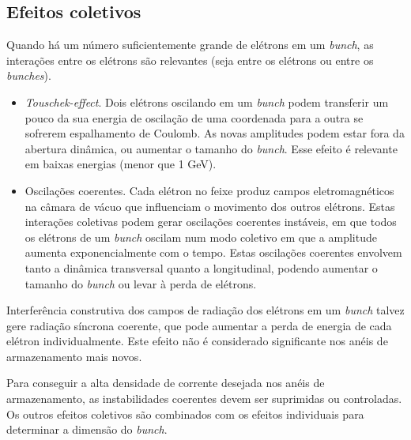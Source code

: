 \subsection{Efeitos coletivos}
Quando há um número suficientemente grande de elétrons em um \textit{bunch}, as interações entre os elétrons são relevantes (seja entre os elétrons ou entre os \textit{bunches}). 
	
\begin{itemize}
	\item \textit{Touschek-effect}. Dois elétrons oscilando em um \textit{bunch} podem transferir um 		pouco da sua energia de oscilação de uma coordenada para a outra se sofrerem espalhamento de 			Coulomb. As novas amplitudes podem estar fora da abertura dinâmica, ou aumentar o tamanho do 			\textit{bunch}. Esse efeito é relevante em baixas energias (menor que 1 GeV).
    \item Oscilações coerentes. Cada elétron no feixe produz campos eletromagnéticos na câmara de vácuo 	que influenciam o movimento dos outros elétrons. Estas interações coletivas podem gerar oscilações 		coerentes instáveis, em que todos os elétrons de um \textit{bunch} oscilam num modo coletivo em que 	a amplitude aumenta exponencialmente com o tempo. Estas oscilações coerentes envolvem tanto a 			dinâmica transversal quanto a longitudinal, podendo aumentar o tamanho do \textit{bunch} ou levar à 	perda de elétrons.
\end{itemize}
	
Interferência construtiva dos campos de radiação dos elétrons em um \textit{bunch} talvez gere radiação síncrona coerente, que pode aumentar a perda de energia de cada elétron individualmente. Este efeito não é considerado significante nos anéis de armazenamento mais novos.
	
Para conseguir a alta densidade de corrente desejada nos anéis de armazenamento, as instabilidades coerentes devem ser suprimidas ou controladas. Os outros efeitos coletivos são combinados com os efeitos individuais para determinar a dimensão do \textit{bunch}.